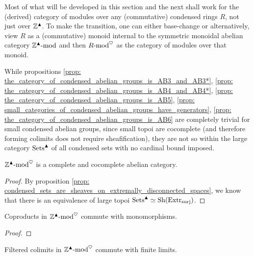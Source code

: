             \begin{remark}
                Most of what will be developed in this section and the next shall work for the (derived) category of modules over any (commutative) condensed rings $R$, not just over $\mathbb{Z}^{\blacktriangle}$. To make the transition, one can either base-change or alternatively, view $R$ as a (commutative) monoid internal to the symmetric monoidal abelian category $\mathbb{Z}^{\blacktriangle}\text{-}\mathrm{mod}$ and then $R\text{-}\mathrm{mod}^{\heartsuit}$ as the category of modules over that monoid. 
            \end{remark}
            \begin{remark}
                While propositions \ref{prop: the_category_of_condensed_abelian_groups_is_AB3_and_AB3*}, \ref{prop: the_category_of_condensed_abelian_groups_is_AB4_and_AB4*}, \ref{prop: the_category_of_condensed_abelian_groups_is_AB5}, \ref{prop: small_categories_of_condensed_abelian_groups_have_generators}, \ref{prop: the_category_of_condensed_abelian_groups_is_AB6} are completely trivial for small condensed abelian groups, since small topoi are cocomplete (and therefore forming colimits does not require sheafification), they are not so within the large category $\mathrm{Sets}^{\blacktriangle}$ of all condensed sets with no cardinal bound imposed.
            \end{remark}
            \begin{proposition} \label{prop: the_category_of_condensed_abelian_groups_is_AB3_and_AB3*}
                $\mathbb{Z}^{\blacktriangle}\text{-}\mathrm{mod}^{\heartsuit}$ is a complete and cocomplete abelian category.
            \end{proposition}
                \begin{proof}
                    By proposition \ref{prop: condensed_sets_are_sheaves_on_extremally_disconnected_spaces}, we know that there is an equivalence of large topoi $\mathrm{Sets}^{\blacktriangle} \simeq \mathrm{Sh}(\mathrm{Extr}_{\mathrm{surj}})$.
                \end{proof}
            \begin{proposition} \label{prop: the_category_of_condensed_abelian_groups_is_AB4_and_AB4*}
                Coproducts in $\mathbb{Z}^{\blacktriangle}\text{-}\mathrm{mod}^{\heartsuit}$ commute with monomorphisms.
            \end{proposition}
                \begin{proof}
                    
                \end{proof}
            \begin{proposition} \label{prop: the_category_of_condensed_abelian_groups_is_AB5}
                Filtered colimits in $\mathbb{Z}^{\blacktriangle}\text{-}\mathrm{mod}^{\heartsuit}$ commute with finite limits.
            \end{proposition}
